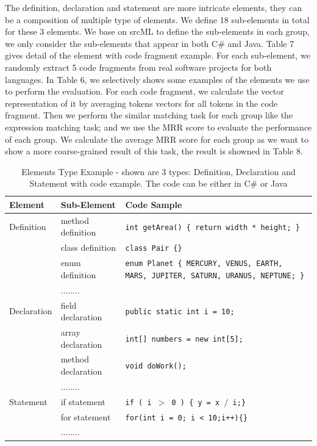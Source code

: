 The definition, declaration and statement are more intricate elements, they can be a composition of multiple type of elements. We define 18 sub-elements in total for these 3 elements. We base on srcML \cite{collard2011lightweight} to define the sub-elements in each group, we only consider the sub-elements that appear in both C\# and Java. Table 7 gives detail of the element with code fragment example. For each sub-element, we randomly extract 5 code fragments from real software projects for both languages. In Table 6, we selectively shows some examples of the elements we use to perform the evaluation. For each code fragment, we calculate the vector representation of it by averaging tokens vectors for all tokens in the code fragment. Then we perform the similar matching task for each group like the expression matching task; and we use the MRR score to evaluate the performance of each group.  We calculate the average MRR score for each group as we want to show a more coarse-grained result of this task, the result is showned in Table 8.


\begin{table}
	\label{tab:freq}
	
	\begin{tabular}{p{2cm}|l|p{5cm}}
		
		\hline
		Element &Sub-Element& Code Sample\\
		\hline
		Definition & method definition & \texttt{int getArea() \{
				return width * height;
		\}}\\\cline{2-3}
		
		& class definition & \texttt{class Pair \{\}}\\\cline{2-3}
		
		& enum definition & \texttt{enum Planet \{ MERCURY, VENUS, EARTH, MARS, JUPITER, SATURN, URANUS, NEPTUNE; \}}   \\\cline{2-3}
		
		& ........ &  \\\cline{2-3}
		\hline
		
		
		Declaration & field declaration & \texttt{public static int i = 10;} \\\cline{2-3}
		
	
		& array declaration & \texttt{int[] numbers = new int[5];} \\\cline{2-3}
		
		& method declaration & \texttt{void doWork();} \\\cline{2-3}
		
		
			& ........ &  \\\cline{2-3}
		\hline
		Statement & if statement & \texttt{if ( i $>$ 0 ) \{ y = x $/$ i;\}}\\\cline{2-3}
		
		& for statement & \texttt{for(int i = 0; i < 10;i++)\{\}}\\\cline{2-3}
		& ........ & \\\cline{1-3}

	\end{tabular}
	\medskip
	\caption{Elements Type Example - shown are 3 types: Definition, Declaration and Statement with code example. The code can be either in C\# or Java}
\end{table}


